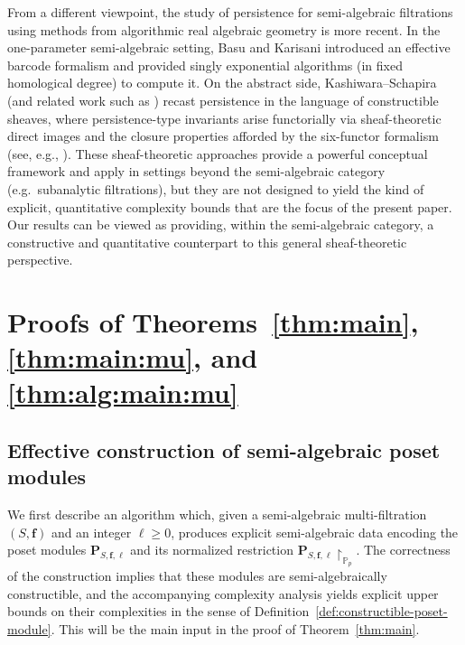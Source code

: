 \documentclass{amsart}[10pts]
\theoremstyle{definition}
\theoremstyle{remark}
\theoremstyle{observation}
\numberwithin{equation}{section}
\newcommand {\PP}     {\mathbb{P}} %
\begin{document}
\medskip
From a different viewpoint, the study of persistence for semi-algebraic filtrations using methods from algorithmic real algebraic geometry is more recent. 
In the one-parameter semi-algebraic setting, Basu and Karisani \cite{Basu-Karisani-2} introduced an effective barcode formalism and provided singly exponential algorithms (in fixed homological degree) to compute it. 
On the abstract side, Kashiwara--Schapira \cite{KS2018} (and related work such as \cite{Miller2023,Berkouk2023,Curry-Patel}) recast persistence in the language of constructible sheaves, where persistence-type invariants arise functorially via sheaf-theoretic direct images and the closure properties afforded by the six-functor formalism (see, e.g., \cite{Kashiwara-book}). 
These sheaf-theoretic approaches provide a powerful conceptual framework and apply in settings beyond the semi-algebraic category (e.g.\ subanalytic filtrations), but they are not designed to yield the kind of explicit, quantitative complexity bounds that are the focus of the present paper.
Our results can be viewed as providing, within the semi-algebraic category, a constructive and quantitative counterpart to this general sheaf-theoretic perspective.




\section{Proofs of Theorems~\ref{thm:main}, \ref{thm:main:mu}, 
and \ref{thm:alg:main:mu}
}
\label{sec:proof:1-2}




\subsection{Effective construction of semi-algebraic poset modules}
\label{subsec:input-output}

We first describe an algorithm which, given a semi-algebraic multi-filtration $(S,\mathbf f)$ and an integer $\ell\ge 0$, produces explicit semi-algebraic data encoding the poset modules
$\mathbf P_{S,\mathbf f,\ell}$ and its normalized restriction $\mathbf P_{S,\mathbf f,\ell}\!\restriction_{\PP_p}$.
The correctness of the construction implies that these modules are semi-algebraically constructible, and the accompanying complexity analysis yields explicit upper bounds on their complexities in the sense of Definition~\ref{def:constructible-poset-module}. This will be the main input in the proof of Theorem~\ref{thm:main}.
\end{document}
